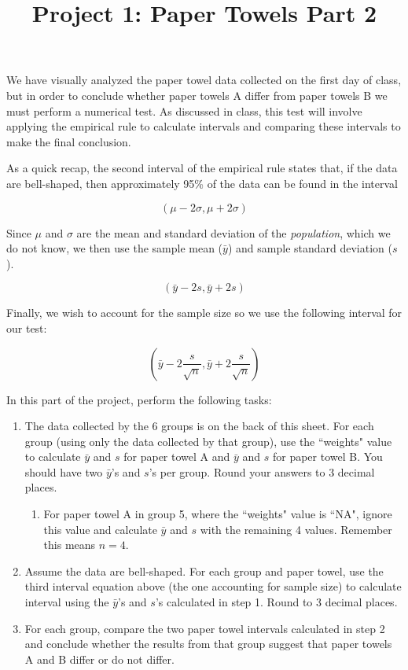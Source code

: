 \documentclass[12pt]{article}
\begin{document}
 
\title{Project 1: Paper Towels Part 2}
\date{}

\maketitle

We have visually analyzed the paper towel data collected on the first day of class, but in order to conclude whether paper towels A differ from paper towels B we must perform a numerical test. As discussed in class, this test will involve applying the empirical rule to calculate intervals and comparing these intervals to make the final conclusion.

As a quick recap, the second interval of the empirical rule states that, if the data are bell-shaped, then approximately 95\% of the data can be found in the interval

$$
(\mu - 2\sigma, \mu + 2\sigma)
$$

Since $\mu$ and $\sigma$ are the mean and standard deviation of the \textit{population}, which we do not know, we then use the sample mean ($\bar{y}$) and sample standard deviation ($s$).

$$
(\bar{y} - 2s, \bar{y} + 2s)
$$

Finally, we wish to account for the sample size so we use the following interval for our test:

$$
\left(\bar{y} - 2\frac{s}{\sqrt{n}}, \bar{y} + 2\frac{s}{\sqrt{n}}\right)
$$

In this part of the project, perform the following tasks:

\begin{enumerate}
	\item The data collected by the 6 groups is on the back of this sheet. For each group (using only the data collected by that group), use the ``weights" value to calculate $\bar{y}$ and $s$ for paper towel A and $\bar{y}$ and $s$ for paper towel B. You should have two $\bar{y}$'s and $s$'s per group. Round your answers to 3 decimal places.
	\begin{enumerate}
		\item For paper towel A in group 5, where the ``weights" value is ``NA", ignore this value and calculate $\bar{y}$ and $s$ with the remaining 4 values. Remember this means $n = 4$.
	\end{enumerate}
	\item Assume the data are bell-shaped. For each group and paper towel, use the third interval equation above (the one accounting for sample size) to calculate interval using the $\bar{y}$'s and $s$'s calculated in step 1. Round to 3 decimal places.
	\item For each group, compare the two paper towel intervals calculated in step 2 and conclude whether the results from that group suggest that paper towels A and B differ or do not differ.
\end{enumerate}
\end{document}
